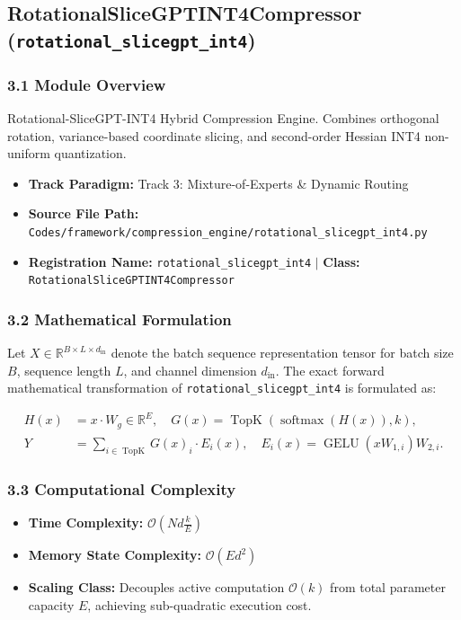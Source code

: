 \subsection{RotationalSliceGPTINT4Compressor (\texttt{rotational\_slicegpt\_int4})}
\label{sec:app_module_rotational_slicegpt_int4}

\subsubsection*{3.1 Module Overview}
Rotational-SliceGPT-INT4 Hybrid Compression Engine. Combines orthogonal rotation, variance-based coordinate slicing, and second-order Hessian INT4 non-uniform quantization.
\begin{itemize}
    \item \textbf{Track Paradigm:} Track 3: Mixture-of-Experts & Dynamic Routing
    \item \textbf{Source File Path:} \texttt{Codes/framework/compression\_engine/rotational\_slicegpt\_int4.py}
    \item \textbf{Registration Name:} \texttt{rotational\_slicegpt\_int4} $\mid$ \textbf{Class:} \texttt{RotationalSliceGPTINT4Compressor}
\end{itemize}

\subsubsection*{3.2 Mathematical Formulation}
Let $X \in \mathbb{R}^{B \times L \times d_{\text{in}}}$ denote the batch sequence representation tensor for batch size $B$, sequence length $L$, and channel dimension $d_{\text{in}}$. The exact forward mathematical transformation of \texttt{rotational\_slicegpt\_int4} is formulated as:

\begin{align}
H(x) &= x \cdot W_g \in \mathbb{R}^{E}, \quad G(x) = \operatorname{TopK}\left(\operatorname{softmax}(H(x)), k\right), \\
Y &= \sum_{i \in \operatorname{TopK}} G(x)_i \cdot E_i(x), \quad E_i(x) = \operatorname{GELU}(x W_{1, i}) W_{2, i}.
\end{align}


\subsubsection*{3.3 Computational Complexity}
\begin{itemize}
    \item \textbf{Time Complexity:} $\mathcal{O}(N d \frac{k}{E})$
    \item \textbf{Memory State Complexity:} $\mathcal{O}(E d^2)$
    \item \textbf{Scaling Class:} Decouples active computation $\mathcal{O}(k)$ from total parameter capacity $E$, achieving sub-quadratic execution cost.
\end{itemize}

